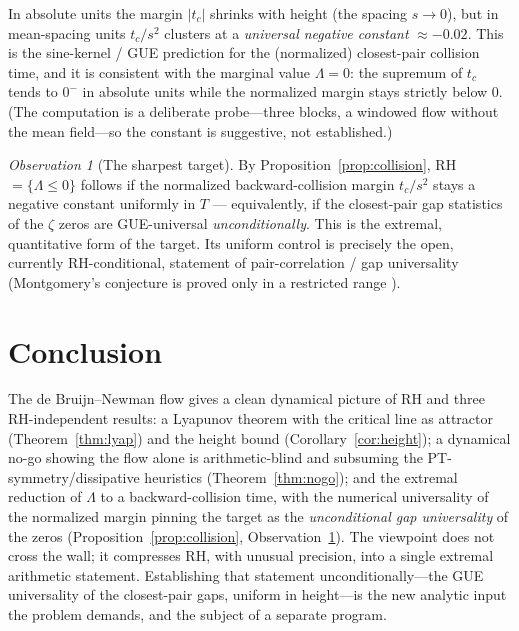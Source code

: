 \documentclass[11pt]{amsart}
\theoremstyle{definition}
\theoremstyle{remark}
\newtheorem{observation}[theorem]{Observation}
\begin{document}
In absolute units the margin $|t_c|$ shrinks with height (the spacing $s\to0$), but in mean-spacing units
$t_c/s^2$ clusters at a \emph{universal negative constant} $\approx-0.02$. This is the sine-kernel / GUE
prediction for the (normalized) closest-pair collision time, and it is consistent with the marginal value
$\Lambda=0$: the supremum of $t_c$ tends to $0^-$ in absolute units while the normalized margin stays strictly
below $0$. (The computation is a deliberate probe---three blocks, a windowed flow without the mean field---so
the constant is suggestive, not established.)

\begin{observation}[The sharpest target]\label{obs:target}
By Proposition~\ref{prop:collision}, RH $=\{\Lambda\le0\}$ follows if the normalized backward-collision margin
$t_c/s^2$ stays a negative constant uniformly in $T$ --- equivalently, if the closest-pair gap statistics of
the $\zeta$ zeros are GUE-universal \emph{unconditionally}. This is the extremal, quantitative form of the
target. Its uniform control is precisely the open, currently RH-conditional, statement of pair-correlation /
gap universality (Montgomery's conjecture is proved only in a restricted range \cite{Mont}).
\end{observation}

\section{Conclusion}\label{sec:concl}

The de Bruijn--Newman flow gives a clean dynamical picture of RH and three RH-independent results: a Lyapunov
theorem with the critical line as attractor (Theorem~\ref{thm:lyap}) and the height bound
(Corollary~\ref{cor:height}); a dynamical no-go showing the flow alone is arithmetic-blind and subsuming the
PT-symmetry/dissipative heuristics (Theorem~\ref{thm:nogo}); and the extremal reduction of $\Lambda$ to a
backward-collision time, with the numerical universality of the normalized margin pinning the target as the
\emph{unconditional gap universality} of the zeros (Proposition~\ref{prop:collision},
Observation~\ref{obs:target}). The viewpoint does not cross the wall; it compresses RH, with unusual precision,
into a single extremal arithmetic statement. Establishing that statement unconditionally---the GUE universality
of the closest-pair gaps, uniform in height---is the new analytic input the problem demands, and the subject of
a separate program.
\end{document}
